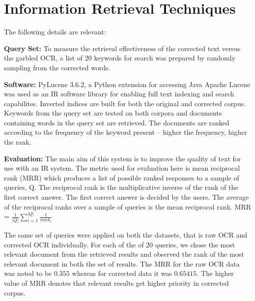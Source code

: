 \documentclass[10pt, conference, compsocconf]{IEEEtran}
\begin{document}
\section{Information Retrieval Techniques}
\label{ir}
The following details are relevant: 

\noindent \textbf{Query Set:} To measure the retrieval effectiveness of the corrected text versus the garbled OCR, a list of 20 keywords for search was prepared by randomly sampling from the corrected words.

\noindent \textbf{Software:} PyLucene 3.6.2, a Python extension for accessing Java Apache Lucene was used as an IR software library for enabling full text indexing and search capabilites. Inverted indices are built for both the original and corrected corpus. Keywords from the query set are tested on both corpora and documents containing words in the query set are retrieved. The documents are ranked according to the frequency of the keyword present -- higher the frequency, higher the rank.

\noindent \textbf{Evaluation:} The main aim of this system is to improve the quality of text for use with an IR system. The metric used for evaluation here is mean reciprocal rank (MRR) which produces a list of possible ranked responses to a sample of queries, Q. The reciprocal rank is the multiplicative inverse of the rank of the first correct answer. The first correct answer is decided by the users. The average of the reciprocal ranks over a sample of queries is the mean reciprocal rank.
MRR = $\frac{1}{|Q|} \sum_{i = 1}^{|Q|} \frac{1}{rank_{i}}$

The same set of queries were applied on both the datasets, that is raw OCR and corrected OCR individually. For each of the of $20$ queries, we chose the most relevant document from the retrieved results and observed the rank of the most relevant document in both the set of results. The MRR for the raw OCR data was noted to be $0.355$ whereas for corrected data it was $0.65415$. The higher value of MRR denotes that relevant results get higher priority in corrected corpus.

 
\end{document}

